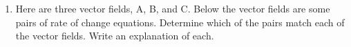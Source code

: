 \begin{enumerate}
\item Here are three vector fields, A, B, and C. Below the vector fields are some pairs of rate of change equations. Determine which of the pairs match each of the vector fields. Write an explanation of each. \label{09HWproblem4}

\end{enumerate}
